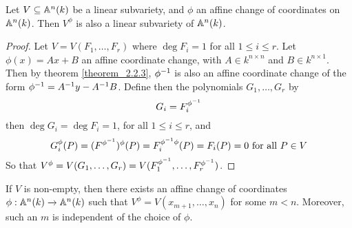 \begin{lemma}\label{lemma_2.2.4}
  Let $V \subseteq \mathbb{A}^n(k)$ be a linear subvariety, and $\phi$ an affine change
  of coordinates on $\mathbb{A}^n(k)$. Then $V^\phi$ is also a linear subvariety of
  $\mathbb{A}^n(k)$.
\end{lemma}
\begin{proof}
  Let $V=V(F_1, \dots, F_r)$ where $\deg{F_i}=1$ for all $1 \leq i \leq r$. Let
  $\phi(x)=Ax+B$ an affine coordinate change, with $A \in k^{n \times n}$ and
  $B \in k^{n \times 1}$. Then by theorem \ref{theorem_2.2.3}, $\phi^{-1}$ is
  also an affine coordinate change of the form $\phi^{-1}=A^{-1}y-A^{-1}B$.
  Define then the polynomials $G_1, \dots, G_r$ by
  \begin{equation*}
    G_i=F_i^{\phi^{-1}}
  \end{equation*}
  then $\deg{G_i}=\deg{F_i}=1$, for all $1 \leq i \leq r$, and
  \begin{equation*}
    G_i^{\phi}(P)=(F^{\phi^{-1}})^{\phi}(P)=F_i^{\phi^{-1}\phi}(P)=F_i(P)=0
    \text{ for all } P \in V
  \end{equation*}
  So that $V^\phi=V(G_1, \dots, G_r)=V(F_1^{\phi^{-1}}, \dots,
  F_r^{\phi^{-1}})$.
\end{proof}
\begin{corollary}
  If $V$ is non-empty, then there exists an affine change of coordinates
  $\phi:\mathbb{A}^n(k) \xrightarrow{} \mathbb{A}^n(k)$ such that $V^\phi=V(x_{m+1}, \dots,
  x_n)$ for some $m<n$. Moreover, such an $m$ is independent of the choice of
  $\phi$.
\end{corollary}

